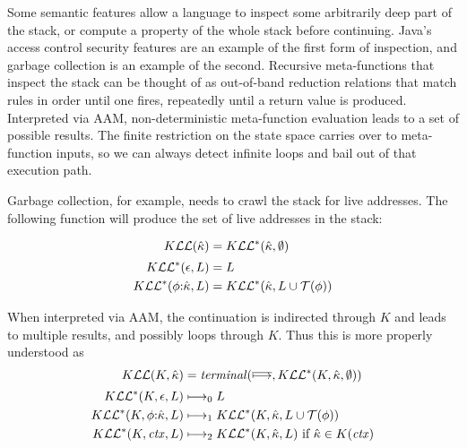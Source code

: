 Some semantic features allow a language to inspect some arbitrarily deep part of the stack, or compute a property of the whole stack before continuing.
%
Java's access control security features are an example of the first form of inspection, and garbage collection is an example of the second.
%
Recursive meta-functions that inspect the stack can be thought of as out-of-band reduction relations that match rules in order until one fires, repeatedly until a return value is produced.
%
Interpreted via AAM, non-deterministic meta-function evaluation leads to a set of possible results.
%
The finite restriction on the state space carries over to meta-function inputs, so we can always detect infinite loops and bail out of that execution path.

Garbage collection, for example, needs to crawl the stack for live addresses.
The following function will produce the set of live addresses in the stack:

\begin{align*}
  K{\mathcal L}{\mathcal L}(\hat{\kappa}) &= K{\mathcal L}{\mathcal L}^*(\hat{\kappa},\emptyset) \\[2pt]
  K{\mathcal L}{\mathcal L}^*(\epsilon,L) &= L \\
  K{\mathcal L}{\mathcal L}^*(\phi{\tt :} \hat{\kappa}, L) &= K{\mathcal L}{\mathcal L}^*(\hat{\kappa}, L\cup{\mathcal T}(\phi))
\end{align*}

When interpreted via AAM, the continuation is indirected through $K$ and leads to multiple results, and possibly loops through $K$.
%
Thus this is more properly understood as
\begin{align*}
  K{\mathcal L}{\mathcal L}(K,\hat{\kappa}) &= \mathit{terminal}(\overline{\longmapsto},K{\mathcal L}{\mathcal L}^*(K,\hat{\kappa},\emptyset)) \\[2pt]
  K{\mathcal L}{\mathcal L}^*(K,\epsilon,L) &\longmapsto_0 L \\
  K{\mathcal L}{\mathcal L}^*(K,\phi{\tt :} \hat{\kappa}, L) &\longmapsto_1 K{\mathcal L}{\mathcal L}^*(K,\hat{\kappa}, L\cup{\mathcal T}(\phi)) \\
  K{\mathcal L}{\mathcal L}^*(K,\mathit{ctx}, L) &\longmapsto_2 K{\mathcal L}{\mathcal L}^*(K,\hat{\kappa},L) \text{ if } \hat{\kappa} \in K(\mathit{ctx})
\end{align*}

